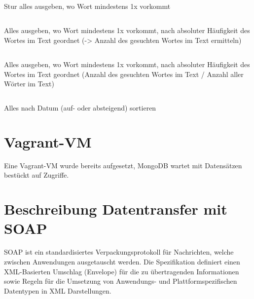 \documentclass[letterpaper, 12pt]{article}
\let\tempsection\section
\renewcommand\section[1]{\vspace{-0.3cm}\tempsection{#1}\vspace{-0.3cm}}
\let\tempsubsection\subsection
\renewcommand\subsection[1]{\vspace{0cm}\tempsubsection{#1}\vspace{0cm}}
\begin{document}
\subsection{}
Stur alles ausgeben, wo Wort mindestens 1x vorkommt

\subsection{}
Alles ausgeben, wo Wort mindestens 1x vorkommt, nach absoluter Häufigkeit des Wortes im Text geordnet (-> Anzahl des gesuchten Wortes im Text ermitteln)


\subsection{}
Alles ausgeben, wo Wort mindestens 1x vorkommt, nach absoluter Häufigkeit des Wortes im Text geordnet (Anzahl des gesuchten Wortes im Text / Anzahl aller Wörter im Text)

\subsection{}
Alles nach Datum (auf- oder absteigend) sortieren

\section{Vagrant-VM}
Eine Vagrant-VM wurde bereits aufgesetzt, MongoDB wartet mit Datensätzen bestückt auf Zugriffe.

\section{Beschreibung Datentransfer mit SOAP}
SOAP ist ein standardisiertes Verpackungsprotokoll für Nachrichten, welche zwischen Anwendungen ausgetauscht werden. Die Spezifikation definiert einen XML-Basierten Umschlag (Envelope) für die zu übertragenden Informationen sowie Regeln für die Umsetzung von Anwendungs- und Plattformspezifischen Datentypen in XML Darstellungen.

\newpage


%
%
\lstlistoflistings
\end{document}
